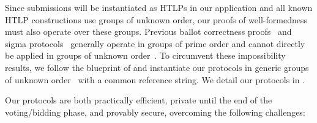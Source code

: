 Since submissions will be instantiated as HTLPs in our application and all known HTLP constructions use groups of unknown order, our proofs of well-formedness must also operate over these groups.
Previous ballot correctness proofs~\cite{ACNS:Groth05} and sigma protocols~\cite{C:Schnorr89,C:ChaPed92} generally operate in groups of prime order and cannot directly be applied in groups of unknown order~\cite{PKC:BanCamMau05}.
To circumvent these impossibility results, we follow the blueprint of \cite{C:BonBunFis19} and instantiate our protocols in generic groups of unknown order~\cite{EC:DamKop02} with a common reference string.
We detail our protocols in .

Our protocols are both practically efficient, private until the end of the voting/bidding phase, and provably secure, overcoming the following challenges:

